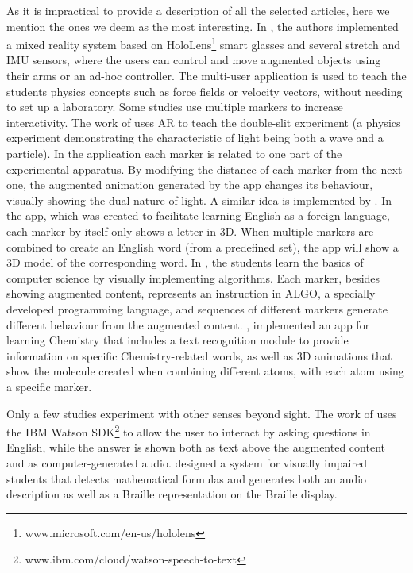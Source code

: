 As it is impractical to provide a description of all the selected articles, here we mention the ones we deem as the most interesting. In \cite{khan2018mathland}, the authors implemented a mixed reality system based on HoloLens\footnote{www.microsoft.com/en-us/hololens} smart glasses and several stretch and \gls{IMU} sensors, where the users can control and move augmented objects using their arms or an ad-hoc controller. The multi-user application is used to teach the students physics concepts such as force fields or velocity vectors, without needing to set up a laboratory.
Some studies use multiple markers to increase interactivity. The work of \cite{wang2018augmented} uses AR to teach the double-slit experiment (a physics experiment demonstrating the characteristic of light being both a wave and a particle). In the application each marker is related to one part of the experimental apparatus. By modifying the distance of each marker from the next one, the augmented animation generated by the app changes its behaviour, visually showing the dual nature of light.
A similar idea is implemented by \cite{boonbrahm2015using}. In the app, which was created to facilitate learning English as a foreign language, each marker by itself only shows a letter in 3D. When multiple markers are combined to create an English word (from a predefined set), the app will show a 3D model of the corresponding word.
In \cite{gardeli2018effect}, the students learn the basics of computer science by visually implementing algorithms. Each marker, besides showing augmented content, represents an instruction in ALGO, a specially developed programming language, and sequences of different markers generate different behaviour from the augmented content. \cite{241-MACARIU20202133}, implemented an app for learning Chemistry that includes a text recognition module to provide information on specific Chemistry-related words, as well as 3D animations that show the molecule created when combining different atoms, with each atom using a specific marker.

Only a few studies experiment with other senses beyond sight. The work of \cite{kenoui2020teach} uses the IBM Watson SDK\footnote{www.ibm.com/cloud/watson-speech-to-text} to allow the user to interact by asking questions in English, while the answer is shown both as text above the augmented content and as computer-generated audio. \cite{mikulowski2020multi} designed a system for visually impaired students that detects mathematical formulas and generates both an audio description as well as a Braille representation on the Braille display.
 
